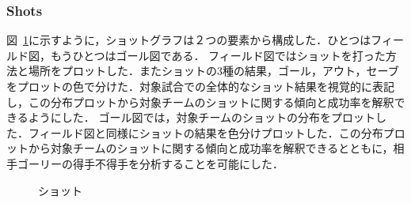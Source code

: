 \documentclass[sotsuron]{kuee}
\begin{document}
			\subsubsection{Shots}
				図~\ref{fig:shots}に示すように，ショットグラフは２つの要素から構成した．ひとつはフィールド図，もうひとつはゴール図である．
				フィールド図ではショットを打った方法と場所をプロットした．またショットの3種の結果，ゴール，アウト，セーブをプロットの色で分けた．対象試合での全体的なショット結果を視覚的に表記し，この分布プロットから対象チームのショットに関する傾向と成功率を解釈できるようにした．
				ゴール図では，対象チームのショットの分布をプロットした．フィールド図と同様にショットの結果を色分けプロットした．この分布プロットから対象チームのショットに関する傾向と成功率を解釈できるとともに，相手ゴーリーの得手不得手を分析することを可能にした．
					\begin{figure}
						\begin{center}
						\end{center}
						\caption{ショット}
				  		\label{fig:shots}
					\end{figure}
\end{document}
